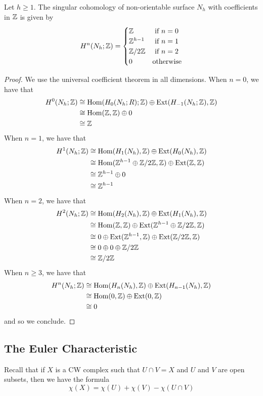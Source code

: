 \documentclass[a4paper]{article}
\begin{document}
\begin{thm}{}{} Let $h\geq 1$. The singular cohomology of non-orientable surface $N_h$ with coefficients in $\mathbb{Z}$ is given by $$H^n(N_h;\mathbb{Z})=\begin{cases}
\mathbb{Z} & \text{ if } n=0\\
\mathbb{Z}^{h-1} & \text{ if } n=1\\
\mathbb{Z}/2\mathbb{Z} & \text{ if } n=2\\
0 & \text{otherwise}
\end{cases}$$ \tcbline
\begin{proof}
We use the universal coefficient theorem in all dimensions. 
When $n=0$, we have that 
\begin{align*}
H^0(N_h;\mathbb{Z})&\cong\operatorname{Hom}(H_0(N_h;R);\mathbb{Z})\oplus\text{Ext}(H_{-1}(N_h;\mathbb{Z}),\mathbb{Z})\\
&\cong\operatorname{Hom}(\mathbb{Z},\mathbb{Z})\oplus 0\\
&\cong\mathbb{Z}
\end{align*}
When $n=1$, we have that 
\begin{align*}
H^1(N_h;\mathbb{Z})&\cong\operatorname{Hom}(H_1(N_h),\mathbb{Z})\oplus\text{Ext}(H_0(N_h),\mathbb{Z})\\
&\cong\operatorname{Hom}(\mathbb{Z}^{h-1}\oplus\mathbb{Z}/2\mathbb{Z},\mathbb{Z})\oplus\text{Ext}(\mathbb{Z},\mathbb{Z})\\
&\cong\mathbb{Z}^{h-1}\oplus 0\\
&\cong\mathbb{Z}^{h-1}
\end{align*}
When $n=2$, we have that 
\begin{align*}
H^2(N_h;\mathbb{Z})&\cong\operatorname{Hom}(H_2(N_h),\mathbb{Z})\oplus\text{Ext}(H_1(N_h),\mathbb{Z})\\
&\cong\operatorname{Hom}(\mathbb{Z},\mathbb{Z})\oplus\text{Ext}(\mathbb{Z}^{h-1}\oplus\mathbb{Z}/2\mathbb{Z},\mathbb{Z})\\
&\cong 0\oplus\text{Ext}(\mathbb{Z}^{h-1},\mathbb{Z})\oplus\text{Ext}(\mathbb{Z}/2\mathbb{Z},\mathbb{Z})\\
&\cong 0\oplus 0\oplus \mathbb{Z}/2\mathbb{Z}\\
&\cong\mathbb{Z}/2\mathbb{Z}
\end{align*}
When $n\geq 3$, we have that 
\begin{align*}
H^n(N_h;\mathbb{Z})&\cong\operatorname{Hom}(H_n(N_h),\mathbb{Z})\oplus\text{Ext}(H_{n-1}(N_h),\mathbb{Z})\\
&\cong\operatorname{Hom}(0,\mathbb{Z})\oplus\text{Ext}(0,\mathbb{Z})\\
&\cong 0
\end{align*}
and so we conclude. 
\end{proof}
\end{thm}

\subsection{The Euler Characteristic}
Recall that if $X$ is a CW complex such that $U\cap V=X$ and $U$ and $V$ are open subsets, then we have the formula $$\chi(X)=\chi(U)+\chi(V)-\chi(U\cap V)$$
\end{document}
